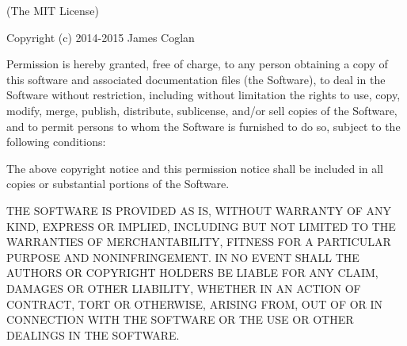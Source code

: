 (The M\+IT License)

Copyright (c) 2014-\/2015 James Coglan

Permission is hereby granted, free of charge, to any person obtaining a copy of this software and associated documentation files (the \textquotesingle{}Software\textquotesingle{}), to deal in the Software without restriction, including without limitation the rights to use, copy, modify, merge, publish, distribute, sublicense, and/or sell copies of the Software, and to permit persons to whom the Software is furnished to do so, subject to the following conditions\+:

The above copyright notice and this permission notice shall be included in all copies or substantial portions of the Software.

T\+HE S\+O\+F\+T\+W\+A\+RE IS P\+R\+O\+V\+I\+D\+ED \textquotesingle{}AS IS\textquotesingle{}, W\+I\+T\+H\+O\+UT W\+A\+R\+R\+A\+N\+TY OF A\+NY K\+I\+ND, E\+X\+P\+R\+E\+SS OR I\+M\+P\+L\+I\+ED, I\+N\+C\+L\+U\+D\+I\+NG B\+UT N\+OT L\+I\+M\+I\+T\+ED TO T\+HE W\+A\+R\+R\+A\+N\+T\+I\+ES OF M\+E\+R\+C\+H\+A\+N\+T\+A\+B\+I\+L\+I\+TY, F\+I\+T\+N\+E\+SS F\+OR A P\+A\+R\+T\+I\+C\+U\+L\+AR P\+U\+R\+P\+O\+SE A\+ND N\+O\+N\+I\+N\+F\+R\+I\+N\+G\+E\+M\+E\+NT. IN NO E\+V\+E\+NT S\+H\+A\+LL T\+HE A\+U\+T\+H\+O\+RS OR C\+O\+P\+Y\+R\+I\+G\+HT H\+O\+L\+D\+E\+RS BE L\+I\+A\+B\+LE F\+OR A\+NY C\+L\+A\+IM, D\+A\+M\+A\+G\+ES OR O\+T\+H\+ER L\+I\+A\+B\+I\+L\+I\+TY, W\+H\+E\+T\+H\+ER IN AN A\+C\+T\+I\+ON OF C\+O\+N\+T\+R\+A\+CT, T\+O\+RT OR O\+T\+H\+E\+R\+W\+I\+SE, A\+R\+I\+S\+I\+NG F\+R\+OM, O\+UT OF OR IN C\+O\+N\+N\+E\+C\+T\+I\+ON W\+I\+TH T\+HE S\+O\+F\+T\+W\+A\+RE OR T\+HE U\+SE OR O\+T\+H\+ER D\+E\+A\+L\+I\+N\+GS IN T\+HE S\+O\+F\+T\+W\+A\+RE. 